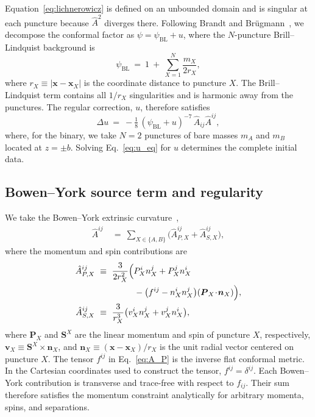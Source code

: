 \documentclass[
  aps,
  prd,
  twocolumn,
  10pt,
  amsmath,
  amssymb,
  nofootinbib,
  superscriptaddress,
  floatfix,
]{revtex4-2}
\newcommand{\vect}[1]{\boldsymbol{#1}}
\newcommand{\psiBL}{\psi_{\mathrm{BL}}}
\newcommand{\Ahat}{\hat{A}}
\begin{document}
Equation~\eqref{eq:lichnerowicz} is defined on an unbounded domain and is
singular at each puncture because $\Ahat^2$ diverges there. Following Brandt and
Br\"ugmann~\cite{BrandtBruegmann1997}, we decompose the conformal factor as
$\psi=\psiBL+u$, where the $N$-puncture Brill--Lindquist background is
\begin{equation}
  \psiBL \ = \ 1 \ + \ \sum_{X=1}^{N} \frac{m_X}{2 r_X},
  \label{eq:psiBL}
\end{equation}
where $r_X \equiv |\vect{x}-\vect{x}_X|$ is the coordinate distance to
puncture $X$. The Brill--Lindquist term contains all $1/r_X$ singularities and
is harmonic away from the punctures. The regular correction, $u$, therefore satisfies
\begin{equation}
  \Delta u \ = \ -\tfrac{1}{8}\,(\psiBL + u)^{-7}\, \Ahat_{ij}\Ahat^{ij},
  \label{eq:u_eq}
\end{equation}
where, for the binary, we take $N=2$ punctures of bare masses $m_A$ and $m_B$
located at $z=\pm b$. Solving Eq.~\eqref{eq:u_eq} for $u$ determines the
complete initial data.


\subsection{Bowen--York source term and regularity}
\label{sec:problem:source}
We take the Bowen--York extrinsic
curvature~\cite{BowenYork1980},
\begin{align}
  \Ahat^{ij} \ &= \ \sum_{X\in\{A,B\}} \bigl(\Ahat^{ij}_{P,X} + \Ahat^{ij}_{S,X}\bigr),
\end{align}
where the momentum and spin contributions are
\begin{align}
  \Ahat^{ij}_{P,X} \ &\equiv \ \frac{3}{2 r_X^2}\Bigl(
  P_X^i n_X^j + P_X^j n_X^i \nonumber \\
  & \hspace{15mm} - \bigl(f^{ij} - n_X^i n_X^j\bigr)(\vect{P}_X\!\cdot\!\vect{n}_X)\Bigr),
  \label{eq:A_P}
  \\
  \Ahat^{ij}_{S,X} \ &\equiv \ \frac{3}{r_X^3}\bigl(v_X^i n_X^j + v_X^j n_X^i\bigr),
  \label{eq:A_S}
\end{align}
where $\vect{P}_X$ and $\vect{S}^{X}$ are the linear momentum and spin of
puncture $X$, respectively,
$\vect{v}_X \equiv \vect{S}^{X}\times\vect{n}_X$, and
$\vect{n}_X \equiv (\vect{x}-\vect{x}_X)/r_X$ is the unit
radial vector centered on puncture $X$. The tensor $f^{ij}$ in Eq.~\eqref{eq:A_P} is the inverse flat
conformal metric. In the Cartesian coordinates used to construct the tensor,
$f^{ij}=\delta^{ij}$. Each Bowen--York contribution is transverse and
trace-free with respect to $f_{ij}$. Their sum therefore satisfies the momentum
constraint analytically for arbitrary momenta, spins, and separations.
\end{document}
